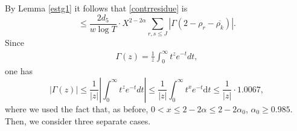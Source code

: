 \documentclass[reqno]{amsart}
\numberwithin{equation}{section}
\theoremstyle{remark}
\begin{document}
By Lemma \ref{estg1} it follows that \eqref{contrresidue} is
\begin{equation}\label{sumrs}
    \le \frac{ 2d_5}{w\log T}\cdot X^{2-2\alpha}\sum_{r,s\le J}\left|\Gamma\left(2-\rho_r-\overline{\rho_k}\right)\right|.
\end{equation}
    Since
\begin{align*}
    \Gamma(z)=\frac{1}{z} \int_0^{\infty} t^z e^{-t} d t,
\end{align*}
one has
\begin{equation}\label{asymboundgamma}
|\Gamma(z)|\le \frac{1}{|z|} \left|\int_0^{\infty} t^z e^{-t} d t\right|\le \frac{1}{|z|}\int_{0}^\infty t^{x}e^{-t}\text{d}t\le \frac{1}{|z|}\cdot 1.0067, 
\end{equation}
where we used the fact that, as before, $0<x\le 2-2\alpha\le 2-2\alpha_0$, $\alpha_0\ge  0.985$.\\
Then, we consider three  separate cases.
\end{document}
